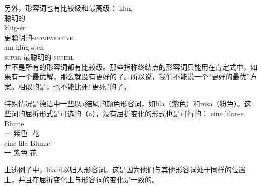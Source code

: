 另外，形容词也有比较级和最高级：
\eal
\ex 
\gll klug\\
	聪明的\\
\ex 
\gll klüg-er\\
	 更聪明的-\textsc{comparative}\\
\ex 
\gll am klüg-sten\\
     \textsc{suprl} 最聪明的-\textsc{superl}\\
\zl
并不是所有的形容词都有比较级。那些指称终结点的形容词只能用在肯定式中，如果有一个最优解，那么就没有更好的了。所以说，我们不能说一个“更好的最优”方案。相似的是，也不能比死“更死”的了。

特殊情况是德语中一些以a结尾的颜色形容词，如lila（紫色）和rosa（粉色）。这些词的屈折形式是可选的（a），没有屈折变化的形式也是可行的：
\eal
\ex 
\gll eine lilan-e Blume\\
	 一 紫色-\fem{} 花\\
\ex 
\gll eine lila Blume\\
	 一 紫色 花\\
\zl

\noindent
上述例子中，lila可以归入形容词。这是因为他们与其他形容词处于同样的位置上，并且在屈折变化上与形容词的变化是一致的。

